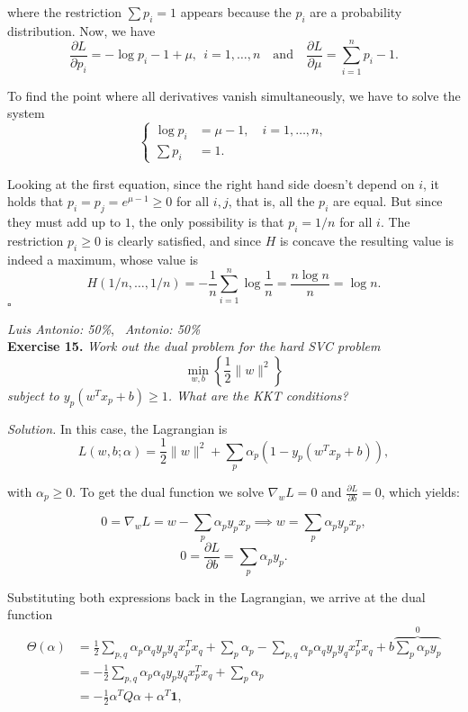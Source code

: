 \documentclass[12pt]{article}
\newcommand*{\QED}{\null\nobreak\hfill\ensuremath{\square}}%
\begin{document}
where the restriction $\sum p_i=1$ appears because the $p_i$ are a probability distribution. Now, we have
\[
     \frac{\partial L}{\partial p_i} = -\log p_i - 1 + \mu, \ \  i=1,\dots,n \quad \text{and} \quad \frac{\partial L}{\partial \mu} =\sum_{i=1}^n p_i - 1.
\]

To find the point where all derivatives vanish simultaneously, we have to solve the system
\[\begin{cases}
    \log p_i &= \mu - 1, \quad i=1,\dots,n,\\
    \sum p_i &= 1.
\end{cases}
\]

Looking at the first equation, since the right hand side doesn't depend on $i$, it holds that $p_i=p_j= e^{\mu - 1}\geq 0$ for all $i,j$, that is, all the \( p_i \) are equal. But since they must add up to $1$, the only possibility is that $p_i=1/n$ for all $i$. The restriction $p_i\geq 0$ is clearly satisfied, and since $H$ is concave the resulting value is indeed a maximum, whose value is
\[
H(1/n,\dots, 1/n) = -\frac{1}{n}\sum_{i=1}^n \log{\frac{1}{n}} = \frac{n\log n}{n}=\log n.
\]
\QED

\vspace{1em}
\textit{Luis Antonio: 50\%}, \ \textit{Antonio: 50\%}\\
\textbf{Exercise 15. }\emph{Work out the dual problem for the hard SVC problem}
\[
\min_{w,b} \left\{\frac{1}{2}\|w\|^2\right\}
\]
\emph{subject to \( y_p(w^Tx_p + b) \geq 1 \). What are the KKT conditions? }

\textit{Solution.} In this case, the Lagrangian is
\[
L(w, b; \alpha)=\frac{1}{2}\|w\|^2 + \sum_{p} \alpha_p(1-y_p(w^Tx_p+b)),
\]

with $\alpha_p\geq 0$. To get the dual function we solve $\nabla_w L = 0$ and $\frac{\partial L}{\partial b}=0$, which yields:

\[
0=\nabla_w L = w - \sum_p \alpha_p y_px_p \implies w = \sum_p \alpha_p y_px_p,
\]
\[
0=\frac{\partial L}{\partial b} = \sum_{p} \alpha_p y_p.
\]

Substituting both expressions back in the Lagrangian, we arrive at the dual function
\begin{align*}
\Theta(\alpha)&= \frac{1}{2} \sum_{p, q}\alpha_p \alpha_q y_p y_q x_p^T x_q + \sum_p \alpha_p - \sum_{p,q} \alpha_p \alpha_q y_p y_q x_p^T x_q + b \overbrace{\sum_p \alpha_py_p}^{0}\\
&= -\frac{1}{2}\sum_{p,q} \alpha_p \alpha_q y_p y_q x_p^T x_q + \sum_p \alpha_p\\
&= -\frac{1}{2}\alpha^TQ\alpha + \alpha^T\mathbf{1},
\end{align*}
\end{document}
